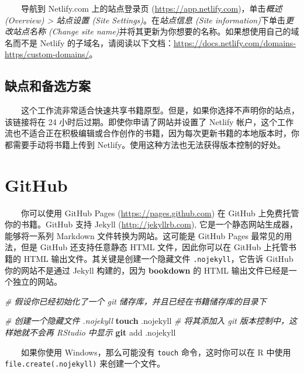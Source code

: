 \documentclass[
  12pt,
]{krantz}
\newenvironment{Shaded}{\begin{snugshade}}{\end{snugshade}}
\newcommand{\CommentTok}[1]{\textcolor[rgb]{0.56,0.35,0.01}{\textit{#1}}}
\newcommand{\FunctionTok}[1]{\textcolor[rgb]{0.13,0.29,0.53}{\textbf{#1}}}
\newcommand{\NormalTok}[1]{#1}
\theoremstyle{definition}
\theoremstyle{definition}
\theoremstyle{definition}
\theoremstyle{definition}
\theoremstyle{remark}
\begin{document}
  导航到 Netlify.com 上的站点登录页 (\url{https://app.netlify.com})，单击\emph{概述 (Overview) \textgreater{} 站点设置 (Site Settings)}。在\emph{站点信息 (Site information)}下单击\emph{更改站点名称 (Change site name)}并将其更新为你想要的名称。如果想使用自己的域名而不是 Netlify 的子域名，请阅读以下文档：\url{https://docs.netlify.com/domains-https/custom-domains/}。

\hypertarget{ux7f3aux70b9ux548cux5907ux9009ux65b9ux6848}{%
\subsection{缺点和备选方案}\label{ux7f3aux70b9ux548cux5907ux9009ux65b9ux6848}}

  这个工作流非常适合快速共享书籍原型。但是，如果你选择不声明你的站点，该链接将在 24 小时后过期。即使你申请了网站并设置了 Netlify 帐户，这个工作流也不适合正在积极编辑或合作创作的书籍，因为每次更新书籍的本地版本时，你都需要手动将书籍上传到 Netlify。使用这种方法也无法获得版本控制的好处。

\hypertarget{github}{%
\section{GitHub}\label{github}}

  你可以使用 GitHub Pages (\url{https://pages.github.com}) 在 GitHub 上免费托管你的书籍。GitHub 支持 Jekyll (\url{http://jekyllrb.com}), 它是一个静态网站生成器，能够将一系列 Markdown 文件转换为网站。这可能是 GitHub Pages 最常见的用法，但是 GitHub 还支持任意静态 HTML 文件，因此你可以在 GitHub 上托管书籍的 HTML 输出文件。其关键是创建一个隐藏文件 \texttt{.nojekyll}，它告诉 GitHub 你的网站不是通过 Jekyll 构建的，因为 \textbf{bookdown} 的 HTML 输出文件已经是一个独立的网站。

\begin{Shaded}
\begin{Highlighting}[]
\CommentTok{\# 假设你已经初始化了一个 git 储存库，并且已经在书籍储存库的目录下}

\CommentTok{\# 创建一个隐藏文件 .nojekyll}
\FunctionTok{touch}\NormalTok{ .nojekyll}
\CommentTok{\# 将其添加入 git 版本控制中，这样她就不会再 RStudio 中显示}
\FunctionTok{git}\NormalTok{ add .nojekyll}
\end{Highlighting}
\end{Shaded}

  如果你使用 Windows，那么可能没有 \texttt{touch} 命令，这时你可以在 R 中使用 \texttt{file.create(\textquotesingle{}.nojekyll\textquotesingle{})} 来创建一个文件。
\end{document}
